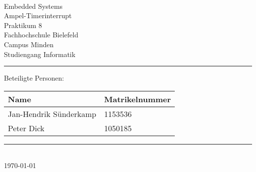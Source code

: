 \begin{titlepage}
   \mbox{}\vspace{5\baselineskip}\\
   \sffamily\huge
   \centering
   {\Huge Embedded Systems} \\
   Ampel-Timerinterrupt\\
    \normalsize Praktikum 8
   \vspace{3\baselineskip}\\
   \rmfamily\Large
  Fachhochschule Bielefeld \\
  Campus Minden \\
  Studiengang Informatik
   \vspace{2\baselineskip}\\
\noindent\rule{15cm}{0.4pt}
Beteiligte Personen:
\begin{table}[H]
	\tablestyle
	\begin{tabular}{*{2}{v{0.45\textwidth}}}
		\hline
		\textbf{Name} & \textbf{Matrikelnummer}
		\tabularnewline
		\hline
		Jan-Hendrik Sünderkamp & 1153536\tabularnewline
		Peter Dick & 1050185\tabularnewline
	\end{tabular}
\end{table}

   \noindent\rule{15cm}{0.4pt}
      \vspace{1\baselineskip}\\
   \today
\end{titlepage}

